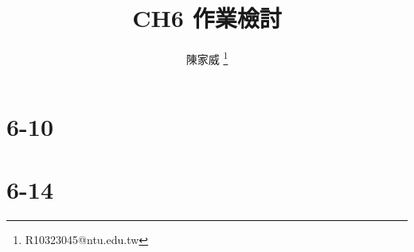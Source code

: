 \documentclass[mathserif]{beamer}
\title{CH6 作業檢討}
\author{陳家威 \thanks{R10323045@ntu.edu.tw}}
\begin{document}
    \begin{frame}    
        \maketitle
    \end{frame}

    \section{6-10}
    
    \section{6-14}
    
\end{document}
